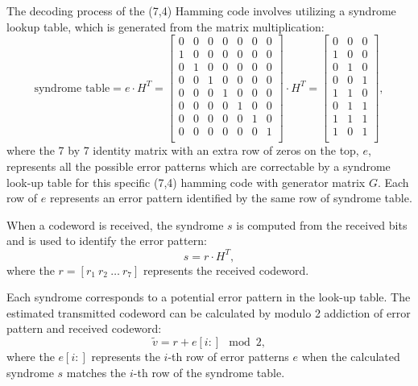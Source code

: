 \documentclass{article}
\begin{document}
The decoding process of the (7,4) Hamming code involves utilizing a syndrome lookup table, which is generated from the matrix multiplication:
\begin{equation*}
\text{syndrome table} = e \cdot H^T = \begin{bmatrix}
0 & 0 & 0 & 0 & 0 & 0 & 0 \\
1 & 0 & 0 & 0 & 0 & 0 & 0 \\
0 & 1 & 0 & 0 & 0 & 0 & 0 \\
0 & 0 & 1 & 0 & 0 & 0 & 0 \\
0 & 0 & 0 & 1 & 0 & 0 & 0 \\
0 & 0 & 0 & 0 & 1 & 0 & 0 \\
0 & 0 & 0 & 0 & 0 & 1 & 0 \\
0 & 0 & 0 & 0 & 0 & 0 & 1 \\
\end{bmatrix} \cdot H^T
= \begin{bmatrix}
    0 & 0 & 0 \\
    1 & 0 & 0 \\
    0 & 1 & 0 \\
    0 & 0 & 1 \\
    1 & 1 & 0 \\
    0 & 1 & 1 \\
    1 & 1 & 1 \\
    1 & 0 & 1 \\
\end{bmatrix} ,
\end{equation*}
where the 7 by 7 identity matrix with an extra row of zeros on the top, $e$, represents all the possible error patterns which are correctable by a syndrome look-up table for this specific (7,4) hamming code with generator matrix $G$. Each row of $e$ represents an error pattern identified by the same row of syndrome table. 

When a codeword is received, the syndrome $s$ is computed from the received bits and is used to identify the error pattern:
\begin{equation*}
    s = r \cdot H^T ,
\end{equation*}
where the $r = [r_1\  r_2\  \dots\  r_7 ]$ represents the received codeword. 

Each syndrome corresponds to a potential error pattern in the look-up table. The estimated transmitted codeword can be calculated by modulo 2 addiction of error pattern and received codeword:
\begin{equation*}
    \tilde{v} = r + e[i:] \mod 2 ,
\end{equation*}
where the $e[i:]$ represents the $i$-th row of error patterns $e$ when the calculated syndrome $s$ matches the $i$-th row of the syndrome table. 
\end{document}
